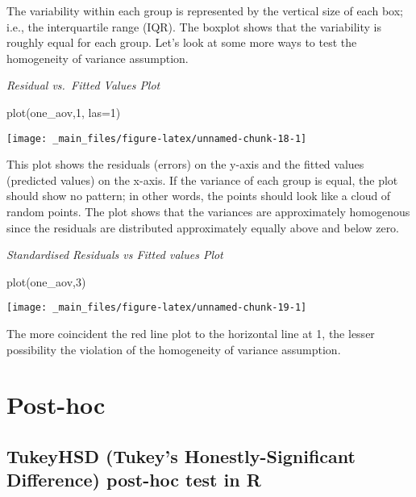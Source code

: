 \documentclass[
]{book}
\newenvironment{Shaded}{\begin{snugshade}}{\end{snugshade}}
\newcommand{\AttributeTok}[1]{\textcolor[rgb]{0.77,0.63,0.00}{#1}}
\newcommand{\DecValTok}[1]{\textcolor[rgb]{0.00,0.00,0.81}{#1}}
\newcommand{\FunctionTok}[1]{\textcolor[rgb]{0.00,0.00,0.00}{#1}}
\newcommand{\NormalTok}[1]{#1}
\begin{document}
The variability within each group is represented by the vertical size of each box; i.e., the interquartile range (IQR). The boxplot shows that the variability is roughly equal for each group. Let's look at some more ways to test the homogeneity of variance assumption.

\emph{Residual vs.~Fitted Values Plot}

\begin{Shaded}
\begin{Highlighting}[]
\FunctionTok{plot}\NormalTok{(one\_aov,}\DecValTok{1}\NormalTok{, }\AttributeTok{las=}\DecValTok{1}\NormalTok{)}
\end{Highlighting}
\end{Shaded}

\begin{center}\texttt{[image: \_main\_files/figure-latex/unnamed-chunk-18-1]} \end{center}

This plot shows the residuals (errors) on the y-axis and the fitted values (predicted values) on the x-axis. If the variance of each group is equal, the plot should show no pattern; in other words, the points should look like a cloud of random points. The plot shows that the variances are approximately homogenous since the residuals are distributed approximately equally above and below zero.

\emph{Standardised Residuals vs Fitted values Plot}

\begin{Shaded}
\begin{Highlighting}[]
\FunctionTok{plot}\NormalTok{(one\_aov,}\DecValTok{3}\NormalTok{)}
\end{Highlighting}
\end{Shaded}

\begin{center}\texttt{[image: \_main\_files/figure-latex/unnamed-chunk-19-1]} \end{center}

The more coincident the red line plot to the horizontal line at 1, the lesser possibility the violation of the homogeneity of variance assumption.

\hypertarget{post-hoc}{%
\chapter{Post-hoc}\label{post-hoc}}

\hypertarget{tukeyhsd-tukeys-honestly-significant-difference-post-hoc-test-in-r}{%
\section{TukeyHSD (Tukey's Honestly-Significant Difference) post-hoc test in R}\label{tukeyhsd-tukeys-honestly-significant-difference-post-hoc-test-in-r}}
\end{document}
